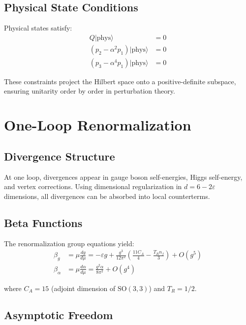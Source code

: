 \documentclass[12pt,a4paper]{article}
\newcommand{\SO}{\text{SO}}
\newcommand{\phys}{\text{phys}}
\begin{document}
\subsection{Physical State Conditions}

Physical states satisfy:
\begin{align}
Q|\phys\rangle &= 0 \label{eq:brst_condition}\\
(p_2 - \alpha^2 p_1)|\phys\rangle &= 0 \label{eq:temporal_constraint_1}\\
(p_3 - \alpha^4 p_1)|\phys\rangle &= 0 \label{eq:temporal_constraint_2}
\end{align}

These constraints project the Hilbert space onto a positive-definite subspace, ensuring unitarity order by order in perturbation theory.

\section{One-Loop Renormalization}
\label{sec:renormalization}

\subsection{Divergence Structure}

At one loop, divergences appear in gauge boson self-energies, Higgs self-energy, and vertex corrections. Using dimensional regularization in $d = 6 - 2\varepsilon$ dimensions, all divergences can be absorbed into local counterterms.

\subsection{Beta Functions}

The renormalization group equations yield:
\begin{align}
\beta_g &= \mu \frac{dg}{d\mu} = -\varepsilon g + \frac{g^3}{12\pi^2}\left(\frac{11C_A}{4} - \frac{T_R n_f}{3}\right) + O(g^5)\\
\beta_\alpha &= \mu \frac{d\alpha}{d\mu} = \frac{g^2\alpha}{8\pi^2} + O(g^4)
\end{align}

where $C_A = 15$ (adjoint dimension of $\SO(3,3)$) and $T_R = 1/2$.

\subsection{Asymptotic Freedom}
\end{document}
